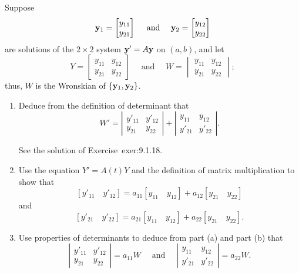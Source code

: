 \documentclass{ximera}
\begin{document}
\begin{problem}\label{exer:10.3.4}
 Suppose
$$
{\bf y}_1=\begin{bmatrix}y_{11}\\y_{21}\end{bmatrix}\quad\text{ and }\quad
{\bf y}_2=\begin{bmatrix}y_{12}\\y_{22}\end{bmatrix}
$$
are solutions of the $2\times 2$ system ${\bf y}'=A{\bf y}$ on
$(a,b)$, and let
$$
 Y=\begin{bmatrix} y_{11} & y_{12}\\ y_{21} & y_{22}\end{bmatrix}\quad\text{ and }\quad
W=\begin{vmatrix} y_{11}&y_{12}\\y_{21}&y_{22}\end{vmatrix};
$$ thus, $W$ is the Wronskian of $\{{\bf y}_1,{\bf y}_2\}$.
\begin{enumerate}
\item %
 Deduce from the definition of  determinant that
$$
W'=\left|\begin{array}{cc} {y'_{11}}&{y'_{12}}\\ {y_{21}}&
{y_{22}}\end{array}\right|
+\left|\begin{array}{cc} {y_{11}}&{y_{12}}\\
 {y'_{21}}&{y'_{22}}\end{array}\right|.
$$
\begin{solution}
    See the solution of Exercise~{exer:9.1.18}.
\end{solution}
\item %
 Use the equation $Y'=A(t)Y$ and
the definition of matrix multiplication to show that
$$
[y'_{11}\quad y'_{12}]=a_{11} [y_{11}\quad y_{12}]+a_{12} [y_{21}
\quad y_{22}]
$$
and
$$
[y'_{21}\quad  y'_{22}]=a_{21} [y_{11}\quad y_{12}]+a_{22}
[y_{21}\quad y_{22}].
$$
\item %
 Use  properties of determinants to deduce from part (a) and part (b)
 that
$$
\left|\begin{array}{cc} {y'_{11}}&{y'_{12}}\\ {y_{21}}&
{y_{22}}\end{array}\right|=a_{11}W\quad\text{ and }\quad
\left|\begin{array}{cc} {y_{11}}&{y_{12}}\\
 {y'_{21}}&{y'_{22}}\end{array}\right|=a_{22}W.
$$


\end{enumerate}
\end{problem}
\end{document}

